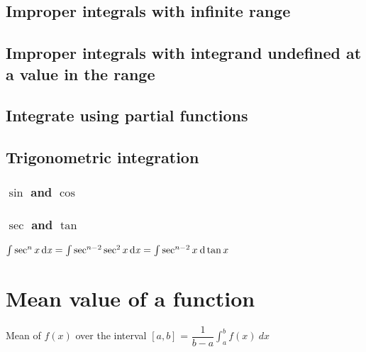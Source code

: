 \subsection{Improper integrals with infinite range}


\subsection{Improper integrals with integrand undefined at a value in the range}


\subsection{Integrate using partial functions}


\subsection{Trigonometric integration}
\subsubsection{$\sin$ and $\cos$}


\subsubsection{$\sec$ and $\tan$}
$\int \sec^n x \operatorname{\mathrm{d}\mathit{x}} = \int \sec^{n-2} \sec^2 x \operatorname{\mathrm{d}\mathit{x}} = \int \sec^{n-2} x \: \mathrm{d} \tan x$

\section{Mean value of a function}
Mean of $f(x)$ over the interval $[a,b]$ = $\dfrac{1}{b-a}\int_{a}^{b} f(x) \: dx$